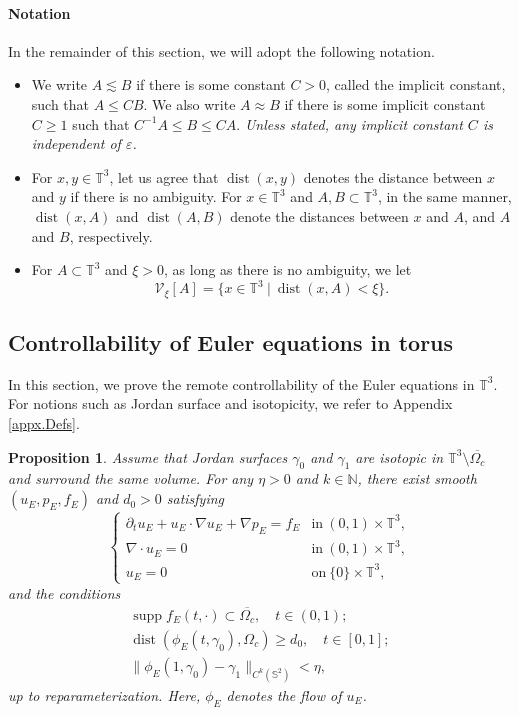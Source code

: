 \documentclass[11pt,a4paper]{article}
\numberwithin{equation}{section}
\newtheorem{proposition}[theorem]{Proposition}
{\theorembodyfont{\rmfamily}\newtheorem{remark}[theorem]{Remark}}
{\theorembodyfont{\rmfamily}\newtheorem{remarks}[theorem]{Remarks}}
\newcommand{\N}{\mathbb{N}}
\renewcommand{\S}{\mathbb{S}}
\newcommand{\T}{\mathbb{T}}
\newcommand{\opsupp}{\operatorname{supp}}
\newcommand{\opdist}{\operatorname{dist}}
\newcommand{\eps}{\varepsilon}
\begin{document}
    \paragraph{Notation} 


In the remainder of this section, we will adopt the following notation.
\begin{itemize}
\item
We write $A\lesssim B$ if there is some constant $C > 0$, called the implicit constant, such that $A\le CB$. We also write $A\approx B$ if there is some implicit constant $C\ge1$ such that $C^{-1}A\le B\le CA$. {\it Unless stated, any implicit constant $C$ is independent of $\eps$.}


\item 
For $x,y\in \T^3$, let us agree that $\opdist(x,y)$ denotes the distance between $x$ and $y$ if there is no ambiguity. For $x\in\T^3$ and $A,B\subset \T^3$, in the same manner, $\opdist(x,A)$ and $\opdist(A,B)$ denote the distances between $x$ and $A$, and $A$ and $B$, respectively.


\item 
For $A\subset \T^3$ and $\xi > 0$, as long as there is no ambiguity, we let 
\[
    \mathcal{V}_{\xi}[A] = \{x\in \T^3~|~ \opdist(x,A) < \xi\}.
\]
\end{itemize}


    \subsection{Controllability of Euler equations in torus}
    \label{sec.Limit.E}


In this section, we prove the remote controllability of the Euler equations in $\T^3$. For notions such as Jordan surface and isotopicity, we refer to Appendix \ref{appx.Defs}.


\begin{proposition}\label{prop.CoE}
Assume that Jordan surfaces $\gamma_0$ and $\gamma_1$ are isotopic in $\T^3\setminus\overline{\Omega_{c}}$ and surround the same volume. For any $\eta>0$ and $k\in\N$, there exist smooth $(u_E, p_E, f_E)$ and $d_0>0$ satisfying 
\begin{equation}\label{eq1.prop.CoE}
    \left\{
    \begin{array}{ll}
    \partial_t u_E + u_E\cdot\nabla u_E + \nabla p_E = f_E &\mbox{in}\ (0,1)\times\T^3,\\
    \nabla\cdot u_E = 0 &\mbox{in}\ (0,1)\times\T^3,\\
    u_E=0 &\mbox{on}\ \{0\}\times\T^3,
    \end{array}\right.
\end{equation}
and the conditions 
\begin{gather}
    \opsupp f_E(t,\cdot) \subset \overline{\Omega_c}, 
    \quad t\in(0,1); \label{item1.prop.CoE} \\
    \opdist(\phi_E(t,\gamma_0),\Omega_c)\geq d_0, 
    \quad t\in [0,1]; \label{item2.prop.CoE} \\
    \|\phi_E(1,\gamma_0)-\gamma_1\|_{C^k(\S^2)}<\eta,  \label{item3.prop.CoE}
\end{gather}
up to reparameterization. Here, $\phi_E$ denotes the flow of $u_E$. 
\end{proposition}
\end{document}
